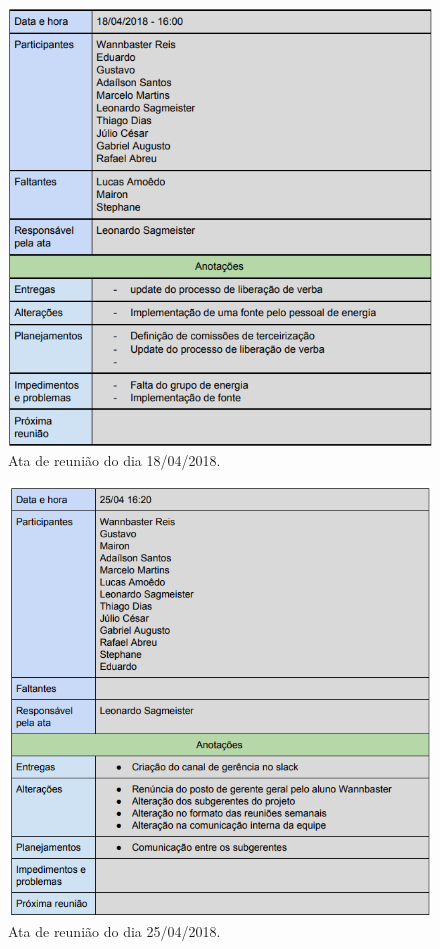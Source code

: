 \begin{apendicesenv}
\begin{figure}[H]
	\centering
	\includegraphics[width=15cm]{figuras/apendice_f.png}
	\caption{Ata de reunião do dia 18/04/2018.
	} \label{apendice_f}
\end{figure}

\begin{figure}[H]
	\centering
	\includegraphics[width=15cm]{figuras/apendice_g.png}
	\caption{Ata de reunião do dia 25/04/2018.
	} \label{apendice_g}
\end{figure}


\end{apendicesenv}
